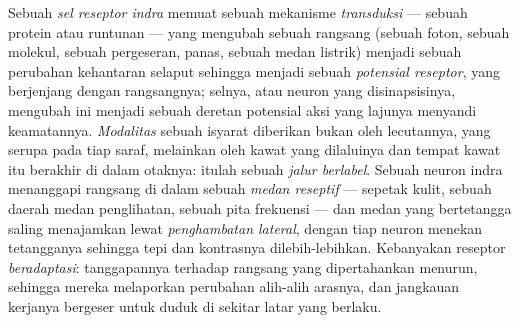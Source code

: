 \begin{definition}\label{def:b3:sensory-systems:principles}
%
Sebuah \emph{sel reseptor indra} memuat sebuah mekanisme \emph{transduksi}
--- sebuah protein atau runtunan --- yang mengubah sebuah rangsang (sebuah foton,
sebuah molekul, sebuah pergeseran, panas, sebuah medan listrik) menjadi sebuah
perubahan kehantaran selaput sehingga menjadi sebuah \emph{potensial reseptor},
yang berjenjang dengan rangsangnya; selnya, atau neuron yang disinapsisinya,
mengubah ini menjadi sebuah deretan potensial aksi yang lajunya menyandi
keamatannya. \emph{Modalitas} sebuah isyarat diberikan bukan oleh lecutannya,
yang serupa pada tiap saraf, melainkan oleh kawat yang dilaluinya dan tempat
kawat itu berakhir di dalam otaknya: itulah sebuah \emph{jalur berlabel}. Sebuah
neuron indra menanggapi rangsang di dalam sebuah \emph{medan reseptif} --- sepetak
kulit, sebuah daerah medan penglihatan, sebuah pita frekuensi --- dan medan yang
bertetangga saling menajamkan lewat \emph{penghambatan lateral}, dengan tiap
neuron menekan tetangganya sehingga tepi dan kontrasnya dilebih-lebihkan.
Kebanyakan reseptor \emph{beradaptasi}: tanggapannya terhadap rangsang yang
dipertahankan menurun, sehingga mereka melaporkan perubahan alih-alih arasnya,
dan jangkauan kerjanya bergeser untuk duduk di sekitar latar yang berlaku.
\end{definition}

